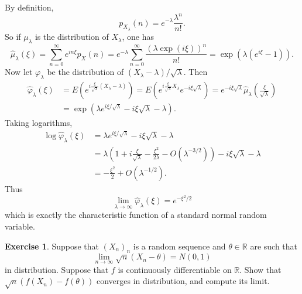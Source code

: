 \documentclass[10pt]{article}
\newcommand{\RR}{\mathbb{R}}
\theoremstyle{definition}
\newtheorem{exer}{Exercise}
\begin{document}
By definition,
$$p_{X_\lambda}(n) = e^{-\lambda}\frac{\lambda^n}{n!}.$$
So if $\mu_\lambda$ is the distribution of $X_\lambda$, one has
$$\hat \mu_\lambda(\xi) = \sum_{n=0}^\infty e^{in\xi} p_X(n) = e^{-\lambda}\sum_{n=0}^\infty \frac{(\lambda \exp(i\xi))^n}{n!} = \exp(\lambda(e^{i\xi} - 1)).$$
Now let $\varphi_\lambda$ be the distribution of $(X_\lambda - \lambda)/\sqrt \lambda$.
Then
\begin{align*}\hat \varphi_\lambda(\xi) &= E(e^{i\frac{\xi}{\sqrt \lambda}(X_\lambda - \lambda)}) = E(e^{i\frac{\xi}{\sqrt \lambda}X_\lambda}e^{-i\xi\sqrt \lambda})
= e^{-i\xi\sqrt \lambda} \hat \mu_\lambda\left(\frac{\xi}{\sqrt \lambda}\right)\\
&= \exp\left(\lambda e^{i\xi/\sqrt \lambda} - i\xi\sqrt \lambda - \lambda\right).
\end{align*}
Taking logarithms,
\begin{align*}\log \hat \varphi_\lambda(\xi) &= \lambda e^{i\xi/\sqrt \lambda} - i\xi\sqrt \lambda - \lambda\\
&= \lambda\left(1 + i\frac{\xi}{\sqrt \lambda} - \frac{\xi^2}{2\lambda} - O(\lambda^{-3/2})\right) - i\xi\sqrt \lambda - \lambda\\
&= -\frac{\xi^2}{2} + O(\lambda^{-1/2}).
\end{align*}
Thus
$$\lim_{\lambda \to \infty} \hat \varphi_\lambda(\xi) = e^{-\xi^2/2}$$
which is exactly the characteristic function of a standard normal random variable.

\begin{exer}
Suppose that $(X_n)_n$ is a random sequence and $\theta \in \RR$ are such that
$$\lim_{n \to \infty} \sqrt n(X_n - \theta) = N(0, 1)$$
in distribution. Suppose that $f$ is continuously differentiable on $\RR$. Show that $\sqrt n(f(X_n) - f(\theta))$ converges in distribution, and compute its limit.
\end{exer}
\end{document}
